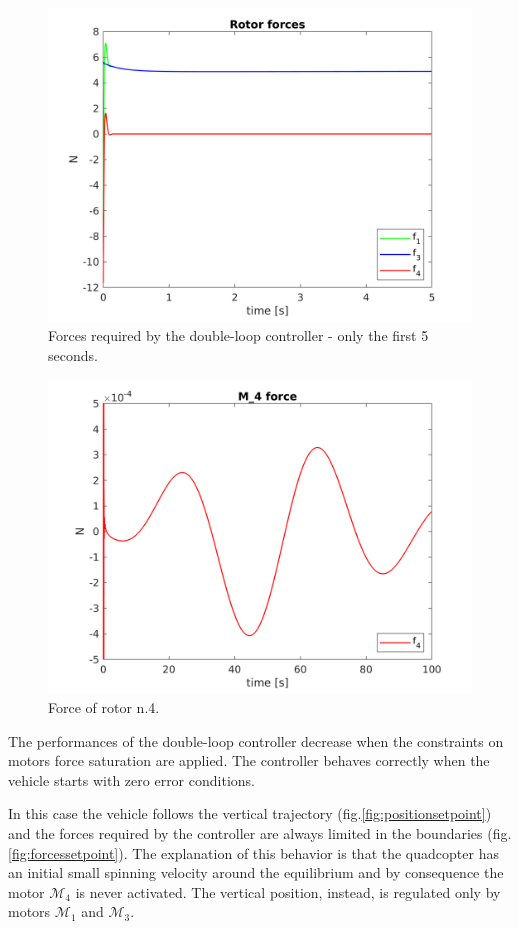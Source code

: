 \documentclass[11pt,a4paper]{scrartcl}
\begin{document}
\begin{figure}
	\centering
	\includegraphics[width=0.7\linewidth]{Images/Forces}
	\caption{Forces required by the double-loop controller - only the first 5 seconds.}
	\label{fig:forces}
\end{figure}

\begin{figure}
	\centering
	\includegraphics[width=0.7\linewidth]{Images/r4force}
	\caption{Force of rotor n.4.}
	\label{fig:r4force}
\end{figure}


The performances of the double-loop controller decrease when the constraints on motors force saturation are applied. The controller behaves correctly when the vehicle starts with zero error conditions. 

In this case the vehicle follows the vertical trajectory (fig.\ref{fig:positionsetpoint}) and the forces required by the controller are always limited in the boundaries (fig.\ref{fig:forcessetpoint}). The explanation of this behavior is that the quadcopter has an initial small spinning velocity around the equilibrium and by consequence the motor $ \mathcal{M}_4 $ is never activated. The vertical position, instead, is regulated only by motors $ \mathcal{M}_1 $ and $ \mathcal{M}_3 $.
\end{document}
